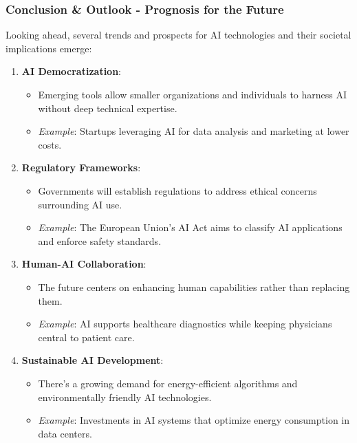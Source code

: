 \documentclass{beamer}
\begin{document}
\begin{frame}[fragile]
    \frametitle{Conclusion \& Outlook - Prognosis for the Future}
    
    Looking ahead, several trends and prospects for AI technologies and their societal implications emerge:
    
    \begin{enumerate}
        \item \textbf{AI Democratization}:
            \begin{itemize}
                \item Emerging tools allow smaller organizations and individuals to harness AI without deep technical expertise.
                \item \textit{Example}: Startups leveraging AI for data analysis and marketing at lower costs.
            \end{itemize}
            
        \item \textbf{Regulatory Frameworks}:
            \begin{itemize}
                \item Governments will establish regulations to address ethical concerns surrounding AI use.
                \item \textit{Example}: The European Union's AI Act aims to classify AI applications and enforce safety standards.
            \end{itemize}
            
        \item \textbf{Human-AI Collaboration}:
            \begin{itemize}
                \item The future centers on enhancing human capabilities rather than replacing them.
                \item \textit{Example}: AI supports healthcare diagnostics while keeping physicians central to patient care.
            \end{itemize}
            
        \item \textbf{Sustainable AI Development}:
            \begin{itemize}
                \item There's a growing demand for energy-efficient algorithms and environmentally friendly AI technologies.
                \item \textit{Example}: Investments in AI systems that optimize energy consumption in data centers.
            \end{itemize}
            

\end{enumerate}
\end{frame}
\end{document}
